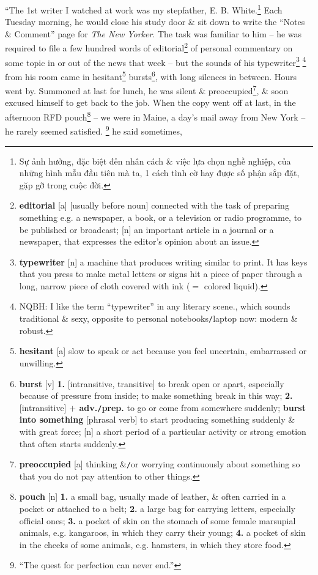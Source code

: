 \documentclass[oneside]{book}
\numberwithin{equation}{section}
\begin{document}
``The 1st writer I watched at work was my stepfather, E. B. White.\footnote{ Sự ảnh hưởng, đặc biệt đến nhân cách \& việc lựa chọn nghề nghiệp, của những hình mẫu đầu tiên mà ta, 1 cách tình cờ hay được số phận sắp đặt, gặp gỡ trong cuộc đời.} Each Tuesday morning, he would close his study door \& sit down to write the ``Notes \& Comment'' page for \textit{The New Yorker}. The task was familiar to him -- he was required to file a few hundred words of editorial\footnote{\textbf{editorial} [a] [usually before noun] connected with the task of preparing something e.g. a newspaper, a book, or a television or radio programme, to be published or broadcast; [n] an important article in a journal or a newspaper, that expresses the editor's opinion about an issue.} of personal commentary on some topic in or out of the news that week -- but the sounds of his typewriter\footnote{\textbf{typewriter} [n] a machine that produces writing similar to print. It has keys that you press to make metal letters or signs hit a piece of paper through a long, narrow piece of cloth covered with ink ($=$ colored liquid).} \footnote{NQBH: I like the term ``typewriter'' in any literary scene., which sounds traditional \& sexy, opposite to personal notebooks\texttt{/}laptop now: modern \& robust.} from his room came in hesitant\footnote{\textbf{hesitant} [a] slow to speak or act because you feel uncertain, embarrassed or unwilling.} bursts\footnote{\textbf{burst} [v] \textbf{1.} [intransitive, transitive] to break open or apart, especially because of pressure from inside; to make something break in this way; \textbf{2.} [intransitive] \textbf{$+$ adv.\texttt{/}prep.} to go or come from somewhere suddenly; \textbf{burst into something} [phrasal verb] to start producing something suddenly \& with great force; [n] a short period of a particular activity or strong emotion that often starts suddenly.}, with long silences in between. Hours went by. Summoned at last for lunch, he was silent \& preoccupied\footnote{\textbf{preoccupied} [a] thinking \&\texttt{/}or worrying continuously about something so that you do not pay attention to other things.}, \& soon excused himself to get back to the job. When the copy went off at last, in the afternoon RFD pouch\footnote{\textbf{pouch} [n] \textbf{1.} a small bag, usually made of leather, \& often carried in a pocket or attached to a belt; \textbf{2.} a large bag for carrying letters, especially official ones; \textbf{3.} a pocket of skin on the stomach of some female marsupial animals, e.g. kangaroos, in which they carry their young; \textbf{4.} a pocket of skin in the cheeks of some animals, e.g. hamsters, in which they store food.} -- we were in Maine, a day's mail away from New York -- he rarely seemed satisfied. \footnote{``The quest for perfection can never end.''} he said sometimes, 
\end{document}
